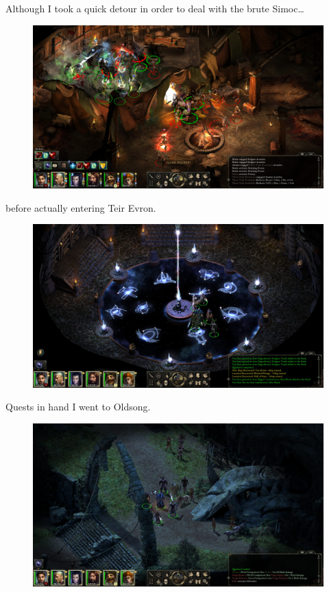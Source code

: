 \documentclass{article}
\begin{document}
Although I took a quick detour in order to deal with the brute Simoc\ldots

\begin{figure}
\includegraphics[scale=0.33]{files/blog/2019_03_04_pillars_of_eternity_path_of_the_damned_act_iii/2019_03_04_elmsreach2.jpg}
\end{figure}

before actually entering Teir Evron.

\begin{figure}
\includegraphics[scale=0.33]{files/blog/2019_03_04_pillars_of_eternity_path_of_the_damned_act_iii/2019_03_04_elmsreach3.jpg}
\end{figure}

Quests in hand I went to Oldsong.

\begin{figure}
\includegraphics[scale=0.33]{files/blog/2019_03_04_pillars_of_eternity_path_of_the_damned_act_iii/2019_03_04_oldsong1.jpg}
\end{figure}
\end{document}
